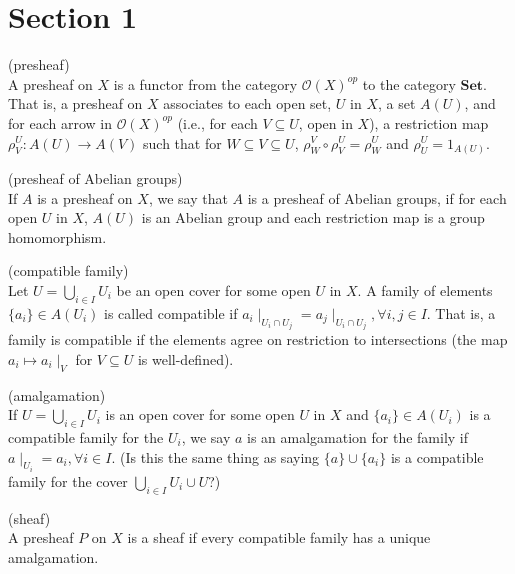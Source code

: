 \section*{Section 1}

\begin{definition*}
	(presheaf)\\ A presheaf on $X$ is a functor from the category $\mathcal{O}(X)^{op}$ to the category $\textbf{Set}$. That is, a presheaf on $X$ associates to each open set, $U$ in $X$, a set $A(U)$, and for each arrow in $\mathcal{O}(X)^{op}$ (i.e., for each $V \subseteq U$, open in $X$), a restriction map $\rho^U_V: A(U) \rightarrow A(V)$ such that for $W \subseteq V \subseteq U$, $\rho^V_W \circ \rho^U_V = \rho^U_W$ and $\rho^U_U =1_{A(U)}$.
\end{definition*}

\begin{definition*}
	(presheaf of Abelian groups)\\ If $A$ is a presheaf on $X$, we say that $A$ is a presheaf of Abelian groups, if for each open $U$ in $X$, $A(U)$ is an Abelian group and each restriction map is a group homomorphism.
\end{definition*}

\begin{definition*}
	(compatible family)\\ Let $U = \bigcup_{i \in I} U_i$ be an open cover for some open $U$ in $X$. A family of elements $\{a_i\} \in A(U_i)$ is called compatible if $a_i \mid_{U_i \cap U_j} = a_j \mid_{U_i \cap U_j}, \forall i,j \in I$. That is, a family is compatible if the elements agree on restriction to intersections (the map $a_i \mapsto a_i \mid_V$ for $V \subseteq U$ is well-defined).
\end{definition*}

\begin{definition*}
	(amalgamation)\\
	If $U = \bigcup_{i \in I} U_i$ is an open cover for some open $U$ in $X$ and  $\{a_i\} \in A(U_i)$ is a compatible family for the $U_i$, we say $a$ is an amalgamation for the family if $a \mid_{U_i} = a_i, \forall i \in I$. (Is this the same thing as saying $\{a\} \cup \{a_i\}$ is a compatible family for the cover $\bigcup_{i \in I} U_i \cup U$?) 
\end{definition*}

\begin{definition*}
	(sheaf)\\
	A presheaf $P$ on $X$ is a sheaf if every compatible family has a unique amalgamation.
\end{definition*}


